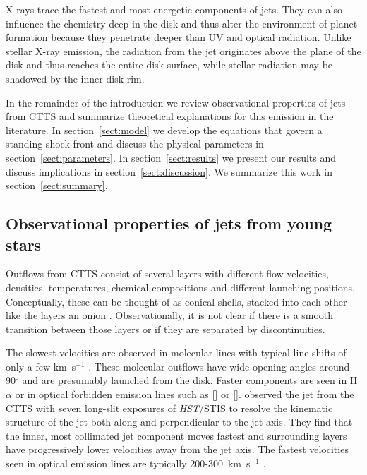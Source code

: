 \documentclass{emulateapj}
\begin{document}
X-rays trace the fastest and most energetic components of jets. They can also influence the chemistry deep in the disk \citep[e.g.][]{2010ApJ...714.1511H,2012ApJ...756..157G} and thus alter the environment of planet formation because they penetrate deeper than UV and optical radiation. Unlike stellar X-ray emission, the radiation from the jet originates above the plane of the disk and thus reaches the entire disk surface, while stellar radiation may be shadowed by the inner disk rim.

In the remainder of the introduction we review observational properties of jets from CTTS and summarize theoretical explanations for this emission in the literature. In section~\ref{sect:model} we develop the equations that govern a standing shock front and discuss the physical parameters in section~\ref{sect:parameters}. In section~\ref{sect:results} we present our results and discuss implications in section~\ref{sect:discussion}. We summarize this work in section~\ref{sect:summary}.

\subsection{Observational properties of jets from young stars}

Outflows from CTTS consist of several layers with different flow velocities, densities, temperatures, chemical compositions and different launching positions. Conceptually, these can be thought of as conical shells, stacked into each other like the layers an onion \citep{2000ApJ...537L..49B}. Observationally, it is not clear if there is a smooth transition between those layers or if they are separated by discontinuities. 

The slowest velocities are observed in molecular lines with typical line shifts of only a few km~s$^{-1}$ \citep{2008ApJ...676..472B}. These molecular outflows have wide opening angles around 90$^{\circ}$ \citep[e.g.][]{2013A&A...557A.110S,2014A&A...564A..11A} and are presumably launched from the disk. Faster components are seen in H$\alpha$ or in optical forbidden emission lines such as [] or []. \citet{2000ApJ...537L..49B} observed the jet from the CTTS  with seven long-slit exposures of \emph{HST}/STIS to resolve the kinematic structure of the jet both along and perpendicular to the jet axis. They find that the inner, most collimated jet component moves fastest and surrounding layers have progressively lower velocities away from the jet axis. The fastest velocities seen in optical emission lines are typically 200-300~km~s$^{-1}$ \citep{2004Ap&SS.292..651B,2008ApJ...689.1112C,2013A&A...550L...1S}.
\end{document}
